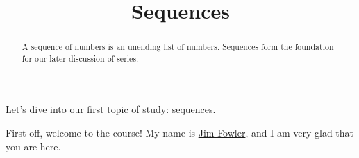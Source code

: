\documentclass{ximera}
\title{Sequences}
\begin{document}
\begin{abstract}
  A sequence of numbers is an unending list of numbers.  Sequences form the foundation for our later discussion of series.
\end{abstract}

\maketitle

Let's dive into our first topic of study: sequences.

First off, welcome to the course!  My name is \href{http://kisonecat.com/}{Jim Fowler}, and I am very glad that you are here.









\end{document}
